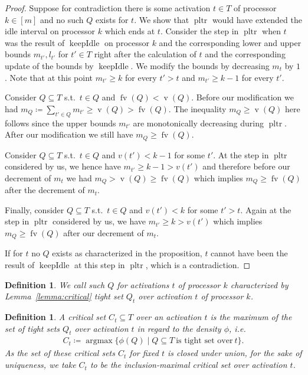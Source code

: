 \documentclass[a4paper]{article}
\DeclareMathOperator{\argmax}{argmax}
\DeclareMathOperator{\PLTR}{pltr}
\DeclareMathOperator{\fv}{fv}
\DeclareMathOperator{\vol}{v}
\DeclareMathOperator{\keepidle}{keepIdle}
\newtheorem{definition}[theorem]{Definition}
\begin{document}
\begin{proof}
  Suppose for contradiction there is some activation $t \in T$ of processor $k \in [m]$ and no such $Q$ exists for $t$.
  We show that $\PLTR$ would have extended the idle interval on processor $k$ which ends at $t$.
  Consider the step in $\PLTR$ when $t$ was the result of $\keepidle$ on processor $k$ and the corresponding lower and upper bounds $m_{t'}, l_{t'}$ for $t' \in T$ right after the calculation of $t$ and the corresponding update of the bounds by $\keepidle$.
  We modify the bounds by decreasing $m_t$ by $1$.
  Note that at this point $m_{t'} \geq k$ for every $t' > t$ and $m_{t'} \geq k - 1$ for every $t'$.

  Consider $Q \subseteq T$ s.t.\ $t \in Q$ and $\fv(Q) < \vol(Q)$.
  Before our modification we had $m_Q \coloneqq \sum_{t' \in Q} m_{t'} \geq \vol(Q) > \fv(Q)$.
  The inequality $m_Q \geq \vol(Q)$ here follows since the upper bounds $m_{t'}$ are monotonically decreasing during $\PLTR$.
  After our modification we still have $m_Q \geq \fv(Q)$.

  Consider $Q \subseteq T$ s.t.\ $t \in Q$ and $v(t') < k - 1$ for some $t'$.
  At the step in $\PLTR$ considered by us, we hence have $m_{t'} \geq k - 1 > v(t')$ and therefore before our decrement of $m_t$ we had $m_Q > \vol(Q) \geq \fv(Q)$ which implies $m_Q \geq \fv(Q)$ after the decrement of $m_t$.

  Finally, consider $Q \subseteq T$ s.t.\ $t \in Q$ and $v(t') < k$ for some $t' > t$.
  Again at the step in $\PLTR$ considered by us, we have $m_{t'} \geq k > v(t')$ which implies $m_Q \geq \fv(Q)$ after our decrement of $m_t$.

  If for $t$ no $Q$ exists as characterized in the proposition, $t$ cannot have been the result of $\keepidle$ at this step in $\PLTR$, which is a contradiction.
\end{proof}

\begin{definition}
  We call such $Q$ for activations $t$ of processor $k$ characterized by Lemma~\ref{lemma:critical} \emph{tight set $Q_t$ over activation $t$ of processor $k$}.
\end{definition}

\begin{definition}
  A \emph{critical set $C_t \subseteq T$ over an activation $t$} is the maximum of the set of tight sets $Q_t$ over activation $t$ in regard to the density $\phi$, i.e.
  \begin{align}
    C_t \coloneqq \argmax \{ \phi(Q) \mid Q \subseteq T~\text{is tight set over}~t \} \text{.}
  \end{align}
  As the set of these critical sets $C_t$ for fixed $t$ is closed under union, for the sake of uniqueness, we take $C_t$ to be the inclusion-maximal critical set over activation $t$.
\end{definition}
\end{document}
